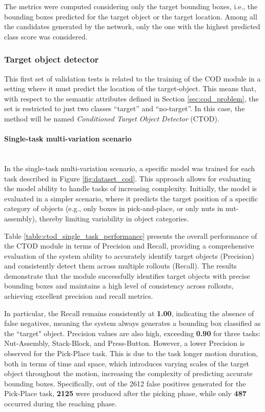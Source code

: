 The metrics were computed considering only the target bounding boxes, i.e., the bounding boxes predicted for the target object or the target location. Among all the candidates generated by the network, only the one with the highest predicted class score was considered.


\subsubsection{Target object detector}
This first set of validation tests is related to the training of the COD module in a setting where it must predict the location of the target-object. This means that, with respect to the semantic attributes defined in Section \ref{sec:cod_problem}, the set is restricted to just two classes ``target'' and ``no-target''. In this case, the method will be named \textit{Conditioned Target Object Detector} (CTOD).
\label{sec:cod_tod}
\paragraph*{Single-task multi-variation scenario}\mbox{}\\
In the single-task multi-variation scenario, a specific model was trained for each task described in Figure \ref{fig:dataset_cod}. This approach allows for evaluating the model ability to handle tasks of increasing complexity. Initially, the model is evaluated in a simpler scenario, where it predicts the target position of a specific category of objects (e.g., only boxes in pick-and-place, or only nuts in nut-assembly), thereby limiting variability in object categories.

Table \ref{table:ctod_single_task_performance} presents the overall performance of the CTOD module in terms of Precision and Recall, providing a comprehensive evaluation of the system ability to accurately identify target objects (Precision) and consistently detect them across multiple rollouts (Recall). The results demonstrate that the module successfully identifies target objects with precise bounding boxes and maintains a high level of consistency across rollouts, achieving excellent precision and recall metrics. 

In particular, the Recall remains consistently at \textbf{1.00}, indicating the absence of false negatives, meaning the system always generates a bounding box classified as the ``target" object. Precision values are also high, exceeding \textbf{0.90} for three tasks: Nut-Assembly, Stack-Block, and Press-Button. However, a lower Precision is observed for the Pick-Place task. This is due to the task longer motion duration, both in terms of time and space, which introduces varying scales of the target object throughout the motion, increasing the complexity of predicting accurate bounding boxes. Specifically, out of the 2612 false positives generated for the Pick-Place task, \textbf{2125} were produced after the picking phase, while only \textbf{487} occurred during the reaching phase.

